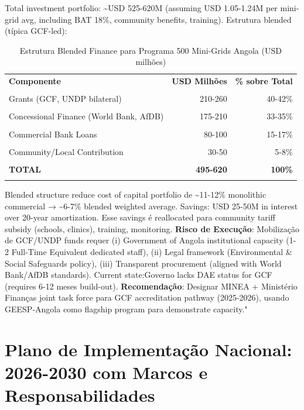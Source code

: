 \documentclass[12pt, a4paper]{article}
\begin{document}
Total investment portfolio: \textasciitilde{}USD 525-620M (assuming USD 1.05-1.24M per mini-grid avg, including BAT 18\%, community benefits, training). Estrutura blended (típica GCF-led):

\begin{table}[H]
\centering
\caption{Estrutura Blended Finance para Programa 500 Mini-Grids Angola (USD milhões)}
\label{tab:blended_finance}

\small
\begin{tabular}{lrr}
\toprule\textbf{Componente} &\textbf{USD Milhões} &\textbf{\% sobre Total} \\\\
\midrule
Grants (GCF, UNDP bilateral) & 210-260 & 40-42\% \\\\
Concessional Finance (World Bank, AfDB) & 175-210 & 33-35\% \\\\
Commercial Bank Loans & 80-100 & 15-17\% \\\\
Community/Local Contribution & 30-50 & 5-8\% \\\\
\midrule\textbf{TOTAL} &\textbf{495-620} &\textbf{100\%} \\\\
\bottomrule
\end{tabular}
\end{table}

Blended structure reduce cost of capital portfolio de \textasciitilde{}11-12\% monolithic commercial → \textasciitilde{}6-7\% blended weighted average. Savings: USD 25-50M in interest over 20-year amortization. Esse savings é reallocated para community tariff subsidy (schools, clinics), training, monitoring.
\textbf{Risco de Execução}: Mobilização de GCF/UNDP funds requer (i) Government of Angola institutional capacity (1-2 Full-Time Equivalent dedicated staff), (ii) Legal framework (Environmental \& Social Safeguards policy), (iii) Transparent procurement (aligned with World Bank/AfDB standards). Current state:Governo lacks DAE status for GCF (requires 6-12 meses build-out).
\textbf{Recomendação}: Designar MINEA + Ministério Finanças joint task force para GCF accreditation pathway (2025-2026), usando GEESP-Angola como flagship program para demonstrate capacity."

\section{Plano de Implementação Nacional: 2026-2030 com Marcos e Responsabilidades}
\end{document}
